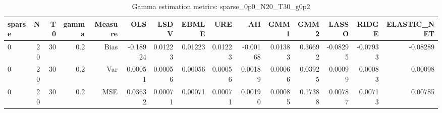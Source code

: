 \begin{table}[!htbp]\centering
\caption{Gamma estimation metrics: sparse_0p0_N20_T30_g0p2}
\label{tab:table1_sparse_0p0_N20_T30_g0p2}
\begin{tabular}{lrrrrrrrrrrrrrr}
\hline
sparse & N & T0 & gamma & Measure & OLS & LSDV & EBMLE & URE & AH & GMM1 & GMM2 & LASSO & RIDGE & ELASTIC_NET \\
\hline
0 & 20 & 30 & 0.2 & Bias & -0.18924 & 0.01223 & 0.01223 & 0.01223 & -0.00168 & 0.01383 & 0.36692 & -0.08295 & -0.07933 & -0.08289 \\
0 & 20 & 30 & 0.2 & Var & 0.00051 & 0.00056 & 0.00056 & 0.00056 & 0.00189 & 0.00066 & 0.03925 & 0.00099 & 0.00083 & 0.00098 \\
0 & 20 & 30 & 0.2 & MSE & 0.03632 & 0.00071 & 0.00071 & 0.00071 & 0.00190 & 0.00085 & 0.17388 & 0.00787 & 0.00713 & 0.00785 \\
\hline
\end{tabular}
\end{table}

